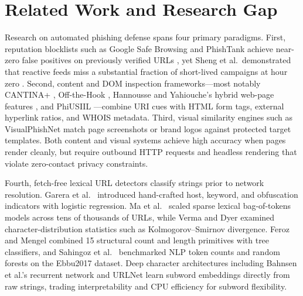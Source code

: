 \documentclass[conference]{IEEEtran}
\begin{document}
\section{Related Work and Research Gap}
\label{sec:related}
Research on automated phishing defense spans four primary paradigms. First, reputation blocklists such as Google Safe Browsing and PhishTank achieve near-zero false positives on previously verified URLs \cite{whittaker2010}, yet Sheng et al.\ demonstrated that reactive feeds miss a substantial fraction of short-lived campaigns at hour zero \cite{sheng2009}. Second, content and DOM inspection frameworks---most notably CANTINA+ \cite{xiang2011}, Off-the-Hook \cite{marchal2017}, Hannousse and Yahiouche's hybrid web-page features \cite{hannousse2021}, and PhiUSIIL \cite{prasad2024}---combine URI cues with HTML form tags, external hyperlink ratios, and WHOIS metadata. Third, visual similarity engines such as VisualPhishNet \cite{abdelnabi2020} match page screenshots or brand logos against protected target templates. Both content and visual systems achieve high accuracy when pages render cleanly, but require outbound HTTP requests and headless rendering that violate zero-contact privacy constraints.

Fourth, fetch-free lexical URL detectors classify strings prior to network resolution. Garera et al.\ \cite{garera2007} introduced hand-crafted host, keyword, and obfuscation indicators with logistic regression. Ma et al.\ \cite{ma2009} scaled sparse lexical bag-of-tokens models across tens of thousands of URLs, while Verma and Dyer \cite{verma2015} examined character-distribution statistics such as Kolmogorov--Smirnov divergence. Feroz and Mengel \cite{feroz2015} combined 15 structural count and length primitives with tree classifiers, and Sahingoz et al.\ \cite{sahingoz2019} benchmarked NLP token counts and random forests on the Ebbu2017 dataset. Deep character architectures including Bahnsen et al.'s recurrent network \cite{bahnsen2017} and URLNet \cite{le2018} learn subword embeddings directly from raw strings, trading interpretability and CPU efficiency for subword flexibility.
\end{document}
